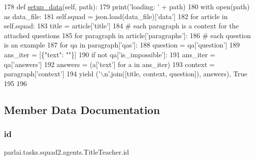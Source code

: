 \begin{DoxyCode}
178     \textcolor{keyword}{def }\hyperlink{namespaceparlai_1_1tasks_1_1multinli_1_1agents_a4fa2cb0ba1ed745336ad8bceed36b841}{setup\_data}(self, path):
179         print(\textcolor{stringliteral}{'loading: '} + path)
180         with open(path) \textcolor{keyword}{as} data\_file:
181             self.squad = json.load(data\_file)[\textcolor{stringliteral}{'data'}]
182         \textcolor{keywordflow}{for} article \textcolor{keywordflow}{in} self.squad:
183             title = article[\textcolor{stringliteral}{'title'}]
184             \textcolor{comment}{# each paragraph is a context for the attached questions}
185             \textcolor{keywordflow}{for} paragraph \textcolor{keywordflow}{in} article[\textcolor{stringliteral}{'paragraphs'}]:
186                 \textcolor{comment}{# each question is an example}
187                 \textcolor{keywordflow}{for} qa \textcolor{keywordflow}{in} paragraph[\textcolor{stringliteral}{'qas'}]:
188                     question = qa[\textcolor{stringliteral}{'question'}]
189                     ans\_iter = [\{\textcolor{stringliteral}{"text"}: \textcolor{stringliteral}{""}\}]
190                     \textcolor{keywordflow}{if} \textcolor{keywordflow}{not} qa[\textcolor{stringliteral}{'is\_impossible'}]:
191                         ans\_iter = qa[\textcolor{stringliteral}{'answers'}]
192                     answers = (a[\textcolor{stringliteral}{'text'}] \textcolor{keywordflow}{for} a \textcolor{keywordflow}{in} ans\_iter)
193                     context = paragraph[\textcolor{stringliteral}{'context'}]
194                     \textcolor{keywordflow}{yield} (\textcolor{stringliteral}{'\(\backslash\)n'}.join([title, context, question]), answers), \textcolor{keyword}{True}
195 
196 
\end{DoxyCode}


\subsection{Member Data Documentation}
\mbox{\label{classparlai_1_1tasks_1_1squad2_1_1agents_1_1TitleTeacher_a7c29404ea09cd71791d48377d35d8e6d}} 
\subsubsection{\texorpdfstring{id}{id}}
{\footnotesize\ttfamily parlai.\+tasks.\+squad2.\+agents.\+Title\+Teacher.\+id}



